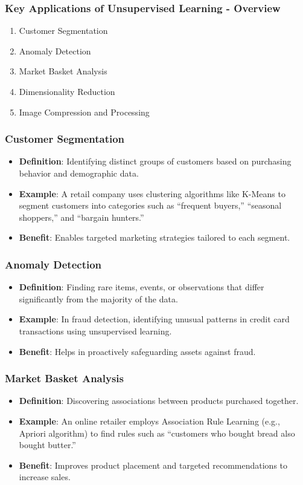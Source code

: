 \documentclass[aspectratio=169]{beamer}
\begin{document}
\begin{frame}[fragile]
  \frametitle{Key Applications of Unsupervised Learning - Overview}
  \begin{enumerate}
    \item Customer Segmentation
    \item Anomaly Detection
    \item Market Basket Analysis
    \item Dimensionality Reduction
    \item Image Compression and Processing
  \end{enumerate}
\end{frame}

\begin{frame}[fragile]
  \frametitle{Customer Segmentation}
  \begin{itemize}
    \item \textbf{Definition}: Identifying distinct groups of customers based on purchasing behavior and demographic data.
    \item \textbf{Example}: A retail company uses clustering algorithms like K-Means to segment customers into categories such as “frequent buyers,” “seasonal shoppers,” and “bargain hunters.”
    \item \textbf{Benefit}: Enables targeted marketing strategies tailored to each segment.
  \end{itemize}
\end{frame}

\begin{frame}[fragile]
  \frametitle{Anomaly Detection}
  \begin{itemize}
    \item \textbf{Definition}: Finding rare items, events, or observations that differ significantly from the majority of the data.
    \item \textbf{Example}: In fraud detection, identifying unusual patterns in credit card transactions using unsupervised learning.
    \item \textbf{Benefit}: Helps in proactively safeguarding assets against fraud.
  \end{itemize}
\end{frame}

\begin{frame}[fragile]
  \frametitle{Market Basket Analysis}
  \begin{itemize}
    \item \textbf{Definition}: Discovering associations between products purchased together.
    \item \textbf{Example}: An online retailer employs Association Rule Learning (e.g., Apriori algorithm) to find rules such as “customers who bought bread also bought butter.”
    \item \textbf{Benefit}: Improves product placement and targeted recommendations to increase sales.
  \end{itemize}
\end{frame}
\end{document}

